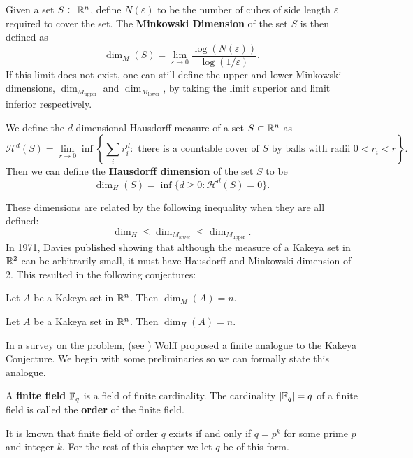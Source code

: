 \begin{definition}
Given a set $S \subset \mathbb R^n$, define $N(\varepsilon)$ to be the number of cubes of side length $\varepsilon$ required to cover the set.
The \textbf{Minkowski Dimension} of the set $S$ is then defined as
$$\dim_M (S) = \lim_{\varepsilon \to 0} \frac{\log( N(\varepsilon))}{\log (1/\varepsilon)}.$$
If this limit does not exist, one can still define the upper and lower Minkowski dimensions, 
$\dim_{M_{\text{upper}}}$ and $\dim_{M_{\text{lower}}}$, by taking the limit superior and limit inferior respectively.
\end{definition}
\begin{definition}
    We define the $d$-dimensional Hausdorff measure of a set $S \subset \mathbb R^n$ as
    $$\mathcal{H}^d(S)=\lim_{r \to 0} \inf \left\{\sum_i r_i^d:\text{ there is a countable cover of } S\text{ by balls with radii } 0 < r_i < r\right\}.$$
    Then we can define the \textbf{Hausdorff dimension} of the set $S$ to be
    $$\dim_H (S) = \inf \{ d \geq 0 : \mathcal{H}^d(S) = 0 \}.   $$
\end{definition}
These dimensions are related by the following inequality when they are all defined:
$$\dim_H \leq \dim_{M_{\text{lower}}} \leq \dim_{M_{\text{upper}}}.$$
In 1971, Davies published \cite{davies1971some} showing that
although the measure of a Kakeya set in $\mathbb R^2$ can be arbitrarily small, it must have Hausdorff and Minkowski dimension of 2.
This resulted in the following conjectures:
\begin{conjecture}
    Let $A$ be a Kakeya set in $\mathbb R^n$. Then $\dim_M (A) = n$. \label{conj:mink-kakeya}
\end{conjecture}
\begin{conjecture}
    Let $A$ be a Kakeya set in $\mathbb R^n$. Then $\dim_H (A) = n$. \label{conj:haus-kakeya}
\end{conjecture}
In a survey on the problem, (see \cite{wolff1999recent}) Wolff proposed a finite analogue to the Kakeya Conjecture. We begin with some preliminaries so we can formally state this analogue.

\begin{definition}
    A \textbf{finite field} $\mathbb{ F}_q$ is a field of finite cardinality. 
    The cardinality $|\mathbb{ F}_q| = q$ of a finite field is called the \textbf{order} of the finite field.
\end{definition}
It is known that finite field of order $q$ exists if and only if $q = p^k$ for some prime $p$ and integer $k$. For the rest of this chapter we let $q$ be of this form.

